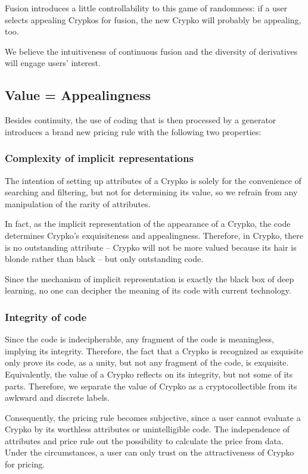 \documentclass[a4paper]{article}
\begin{document}
Fusion introduces a little controllability to this game of randomness: if a user selects appealing Crypkos for fusion, the new Crypko will probably be appealing, too.

We believe the intuitiveness of continuous fusion and the diversity of derivatives will engage users' interest.


\subsection{Value = Appealingness}

Besides continuity, the use of coding that is then processed by a generator introduces a brand new pricing rule with the following two properties:

\subsubsection{Complexity of implicit representations}

The intention of setting up attributes of a Crypko is solely for the convenience of searching and filtering, but not for determining its value, so we refrain from any manipulation of the rarity of attributes.

In fact, as the implicit representation of the appearance of a Crypko, the code determines Crypko's exquisiteness and appealingness. Therefore, in Crypko, there is no outstanding attribute -- Crypko will not be more valued because its hair is blonde rather than black -- but only outstanding code. 

Since the mechanism of implicit representation is exactly the black box of deep learning, no one can decipher the meaning of its code with current technology.

\subsubsection{Integrity of code}

Since the code is indecipherable, any fragment of the code is meaningless, implying its integrity. Therefore, the fact that a Crypko is recognized as exquisite only prove its code, as a unity, but not any fragment of the code, is exquisite. Equivalently, the value of a Crypko reflects on its integrity, but not some of its parts. Therefore, we separate the value of Crypko as a cryptocollectible from its awkward and discrete labels.

Consequently, the pricing rule becomes subjective, since a user cannot evaluate a Crypko by its worthless attributes or unintelligible code. The independence of attributes and price rule out the possibility to calculate the price from data. Under the circumstances, a user can only trust on the attractiveness of Crypko for pricing.
\end{document}
